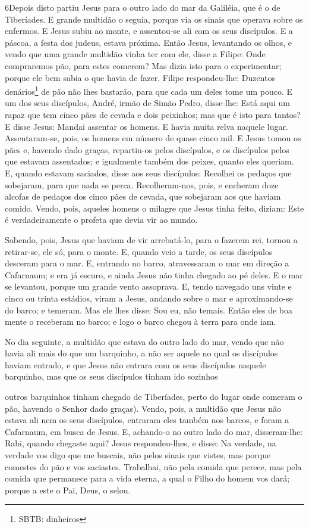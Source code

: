 \medskip

\lettrine{6} Depois disto partiu Jesus para o outro lado do
mar da Galiléia, que é o de Tiberíades. E grande multidão o
seguia, porque via os sinais que operava sobre os enfermos. E
Jesus subiu ao monte, e assentou-se ali com os seus discípulos.
E a páscoa, a festa dos judeus, estava próxima. Então Jesus,
levantando os olhos, e vendo que uma grande multidão vinha ter com
ele, disse a Filipe: Onde compraremos pão, para estes comerem?
Mas dizia isto para o experimentar; porque ele bem sabia o que
havia de fazer. Filipe respondeu-lhe: Duzentos
denários\footnote{SBTB: dinheiros} de pão não lhes bastarão, para
que cada um deles tome um pouco. E um dos seus discípulos,
André, irmão de Simão Pedro, disse-lhe: Está aqui um rapaz que
tem cinco pães de cevada e dois peixinhos; mas que é isto para
tantos? E disse Jesus: Mandai assentar os homens. E havia
muita relva naquele lugar. Assentaram-se, pois, os homens em número
de quase cinco mil. E Jesus tomou os pães e, havendo dado
graças, repartiu-os pelos discípulos, e os discípulos pelos que
estavam assentados; e igualmente também dos peixes, quanto eles
queriam. E, quando estavam saciados, disse aos seus
discípulos: Recolhei os pedaços que sobejaram, para que nada se
perca. Recolheram-nos, pois, e encheram doze alcofas de
pedaços dos cinco pães de cevada, que sobejaram aos que haviam
comido. Vendo, pois, aqueles homens o milagre que Jesus tinha
feito, diziam: Este é verdadeiramente o profeta que devia vir ao
mundo.

Sabendo, pois, Jesus que haviam de vir arrebatá-lo, para o
fazerem rei, tornou a retirar-se, ele só, para o monte. E,
quando veio a tarde, os seus discípulos desceram para o mar.
E, entrando no barco, atravessaram o mar em direção a
Cafarnaum; e era já escuro, e ainda Jesus não tinha chegado ao pé
deles. E o mar se levantou, porque um grande vento assoprava.
E, tendo navegado uns vinte e cinco ou trinta estádios, viram
a Jesus, andando sobre o mar e aproximando-se do barco; e temeram.
Mas ele lhes disse: Sou eu, não temais. Então eles de
boa mente o receberam no barco; e logo o barco chegou à terra para
onde iam.

No dia seguinte, a multidão que estava do outro lado do mar,
vendo que não havia ali mais do que um barquinho, a não ser aquele
no qual os discípulos haviam entrado, e que Jesus não entrara com os
seus discípulos naquele barquinho, mas que os seus discípulos tinham
ido sozinhos

outros barquinhos tinham chegado de Tiberíades, perto do
lugar onde comeram o pão, havendo o Senhor dado graças).
Vendo, pois, a multidão que Jesus não estava ali nem os seus
discípulos, entraram eles também nos barcos, e foram a Cafarnaum, em
busca de Jesus. E, achando-o no outro lado do mar,
disseram-lhe: Rabi, quando chegaste aqui? Jesus
respondeu-lhes, e disse: Na verdade, na verdade vos digo que me
buscais, não pelos sinais que vistes, mas porque comestes do pão e
vos saciastes. Trabalhai, não pela comida que perece, mas
pela comida que permanece para a vida eterna, a qual o Filho do
homem vos dará; porque a este o Pai, Deus, o selou.

